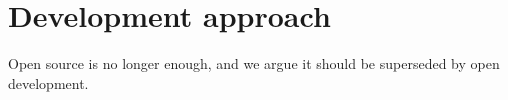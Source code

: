 \section{Development approach}

Open source is no longer enough, and we argue it should be superseded by open development.
